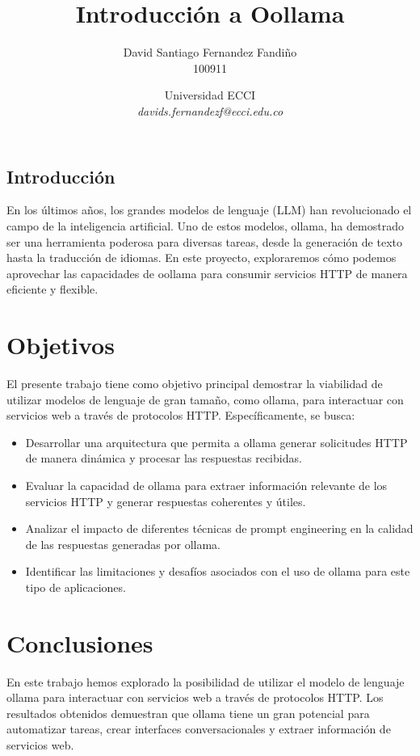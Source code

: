 \documentclass[10pt]{article}
\title{\Huge Introducción a Oollama}
\author{\Large David Santiago Fernandez Fandiño\\ 100911 }
\date{\normalsize Universidad ECCI \\
\textit{davids.fernandezf@ecci.edu.co}}
\begin{document}
\maketitle

\begin{center}
    \section{Introducción}
\end{center}

En los últimos años, los grandes modelos de lenguaje (LLM) han revolucionado el campo de la inteligencia artificial. Uno de estos modelos, ollama, ha demostrado ser una herramienta poderosa para diversas tareas, desde la generación de texto hasta la traducción de idiomas. En este proyecto, exploraremos cómo podemos aprovechar las capacidades de oollama para consumir servicios HTTP de manera eficiente y flexible.

\section{Objetivos}
El presente trabajo tiene como objetivo principal demostrar la viabilidad de utilizar modelos de lenguaje de gran tamaño, como ollama, para interactuar con servicios web a través de protocolos HTTP. Específicamente, se busca:

\begin{itemize}
    \item Desarrollar una arquitectura que permita a ollama generar solicitudes HTTP de manera dinámica y procesar las respuestas recibidas.
    \item Evaluar la capacidad de ollama para extraer información relevante de los servicios HTTP y generar respuestas coherentes y útiles.
    \item Analizar el impacto de diferentes técnicas de prompt engineering en la calidad de las respuestas generadas por ollama.
    \item Identificar las limitaciones y desafíos asociados con el uso de ollama para este tipo de aplicaciones.
\end{itemize}

\section{Conclusiones}
En este trabajo hemos explorado la posibilidad de utilizar el modelo de lenguaje ollama para interactuar con servicios web a través de protocolos HTTP. Los resultados obtenidos demuestran que ollama tiene un gran potencial para automatizar tareas, crear interfaces conversacionales y extraer información de servicios web. 
\end{document}
